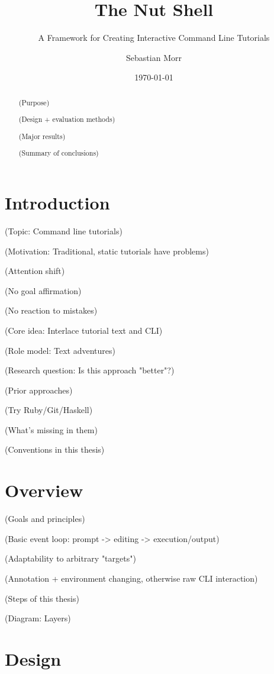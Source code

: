 \documentclass[twoside]{scrreprt}
\title{The Nut Shell}
\subtitle{A Framework for Creating Interactive Command Line Tutorials}
\author{Sebastian Morr}
\date{\today}
\begin{document}
\maketitle
\tableofcontents

\begin{abstract}
        (Purpose)

        (Design + evaluation methods)

        (Major results)

        (Summary of conclusions)
\end{abstract}

\chapter{Introduction}

(Topic: Command line tutorials)

(Motivation: Traditional, static tutorials have problems)

    (Attention shift)

    (No goal affirmation)

    (No reaction to mistakes)

(Core idea: Interlace tutorial text and CLI)

(Role model: Text adventures)

(Research question: Is this approach "better"?)

(Prior approaches)

    (Try Ruby/Git/Haskell)

    (What's missing in them)

(Conventions in this thesis)

\chapter{Overview}

        (Goals and principles)

            (Basic event loop: prompt -> editing -> execution/output)

            (Adaptability to arbitrary "targets")

            (Annotation + environment changing, otherwise raw CLI interaction)

        (Steps of this thesis)

        (Diagram: Layers)

\chapter{Design}
\end{document}

